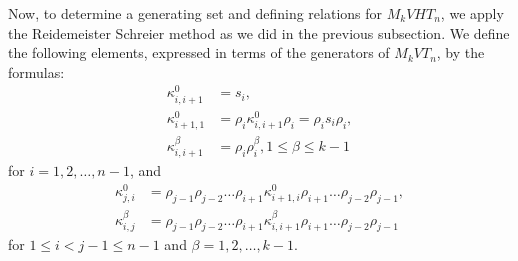 \documentclass[preprint]{elsarticle}
\begin{document}
Now, to determine a generating set and defining relations for $M_kVHT_n$, we apply the Reidemeister Schreier method as we did in the previous subsection. We define the following elements, expressed in terms of the generators of $M_kVT_n$, by the formulas:
\begin{align*}
    \kappa_{i,i+1}^0 &= s_i,\\
    \kappa_{i+1,1}^0 &=\rho_i \kappa_{i,i+1}^0 \rho_i = \rho_is_i\rho_i,\\
    \kappa_{i,i+1}^{\beta} &= \rho_i\rho_i^{\beta}, 1\leq \beta \leq k-1
\end{align*}
for $i=1,2,\dots,n-1$, and 
\begin{align*}
    \kappa_{j,i}^0 &= \rho_{j-1} \rho_{j-2} \dots \rho_{i+1} \kappa_{i+1,i}^0 \rho_{i+1}\dots \rho_{j-2} \rho_{j-1},\\
      \kappa_{i,j}^{\beta} &= \rho_{j-1} \rho_{j-2} \dots \rho_{i+1} \kappa_{i,i+1}^{\beta} \rho_{i+1}\dots \rho_{j-2} \rho_{j-1}
\end{align*} 
for $1\leq i<j-1 \leq n-1$ and  $\beta=1,2,\ldots, k-1.$
\end{document}
